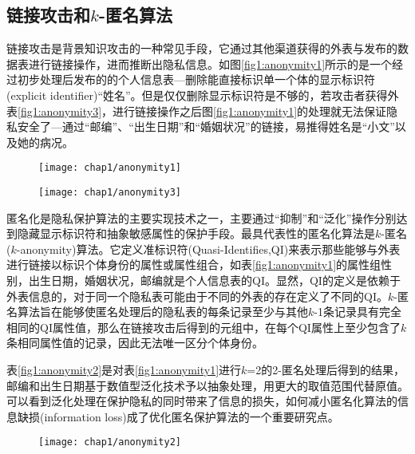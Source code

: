 \subsection{链接攻击和$k$-匿名算法}  %

链接攻击\supercite{k-anonymity}是背景知识攻击的一种常见手段，它通过其他渠道获得的外表与发布的数据表进行链接操作，进而推断出隐私信息。如图\ref{fig1:anonymity1}所示的是一个经过初步处理后发布的的个人信息表---删除能直接标识单一个体的显示标识符(explicit identifier)“姓名”。但是仅仅删除显示标识符是不够的，若攻击者获得外表\ref{fig1:anonymity3}，进行链接操作之后图\ref{fig1:anonymity1}的处理就无法保证隐私安全了---通过“邮编”、“出生日期”和“婚姻状况”的链接，易推得姓名是“小文”以及她的病况。

\begin{figure}[!htp]
	\centering
	\texttt{[image: chap1/anonymity1]}
\end{figure}

\begin{figure}[!htp]
	\centering
	\texttt{[image: chap1/anonymity3]}
\end{figure}


匿名化是隐私保护算法的主要实现技术之一，主要通过“抑制”和“泛化”操作分别达到隐藏显示标识符和抽象敏感属性的保护手段。最具代表性的匿名化算法是$k$-匿名($k$-anonymity)\supercite{k-anonymity}算法。它定义准标识符(Quasi-Identifies,QI)来表示那些能够与外表进行链接以标识个体身份的属性或属性组合，如表\ref{fig1:anonymity1}的属性组{性别，出生日期，婚姻状况，邮编}就是个人信息表的QI。显然，QI的定义是依赖于外表信息的，对于同一个隐私表可能由于不同的外表的存在定义了不同的QI\supercite{anonymity-np}。$k$-匿名算法旨在能够使匿名处理后的隐私表的每条记录至少与其他$k$-1条记录具有完全相同的QI属性值，那么在链接攻击后得到的元组中，在每个QI属性上至少包含了$k$条相同属性值的记录，因此无法唯一区分个体身份。

表\ref{fig1:anonymity2}是对表\ref{fig1:anonymity1}进行$k$=2的2-匿名处理后得到的结果，邮编和出生日期基于数值型泛化技术予以抽象处理，用更大的取值范围代替原值。可以看到泛化处理在保护隐私的同时带来了信息的损失，如何减小匿名化算法的信息缺损(information loss)\supercite{bottom-up-generalization,top-down-specialization,information-loss}成了优化匿名保护算法的一个重要研究点。

\begin{figure}[!htp]
	\centering
	\texttt{[image: chap1/anonymity2]}
\end{figure}

